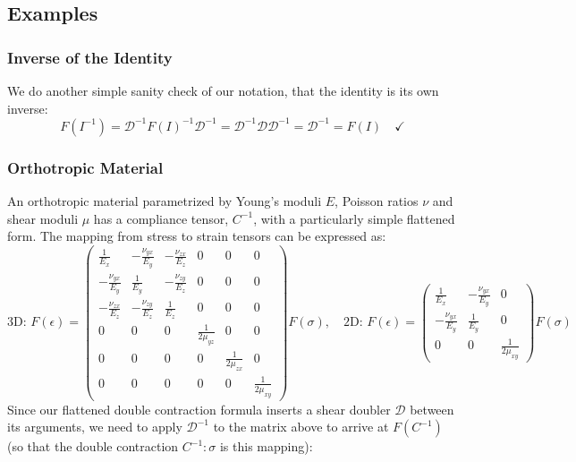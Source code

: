 \documentclass[10pt]{article}
\begin{document}
\subsection{Examples}
\subsubsection{Inverse of the Identity}
We do another simple sanity check of our notation, that the identity is its own
inverse:
$$
F(I^{-1}) = \mathscr{D}^{-1} F(I)^{-1} \mathscr{D}^{-1} = \mathscr{D}^{-1} \mathscr{D} \mathscr{D}^{-1} = \mathscr{D}^{-1} = F(I) \quad \checkmark
$$

\subsubsection{Orthotropic Material}
An orthotropic material parametrized by Young's moduli $E$, Poisson ratios $\nu$
and shear moduli $\mu$ has a compliance tensor, $C^{-1}$, with a particularly simple
flattened form. The mapping from stress to strain tensors can be expressed as:
$$
\text{3D: } F(\epsilon) =
\begin{pmatrix}
    \frac{1}{E_x} & -\frac{\nu_{yx}}{E_y} & -\frac{\nu_{zx}}{E_z} & 0 & 0 & 0 \\
    -\frac{\nu_{yx}}{E_y} & \frac{1}{E_y} & -\frac{\nu_{zy}}{E_z} & 0 & 0 & 0 \\
    -\frac{\nu_{zx}}{E_z} & -\frac{\nu_{zy}}{E_z} & \frac{1}{E_z} & 0 & 0 & 0 \\
    0 & 0 & 0 & \frac{1}{2 \mu_{yz}} & 0 & 0 \\
    0 & 0 & 0 & 0 & \frac{1}{2 \mu_{zx}} & 0 \\
    0 & 0 & 0 & 0 & 0 & \frac{1}{2 \mu_{xy}}
\end{pmatrix} F(\sigma), \quad
\text{2D: } F(\epsilon) = 
\begin{pmatrix}
    \frac{1}{E_x} & -\frac{\nu_{yx}}{E_y} & 0 \\
    -\frac{\nu_{yx}}{E_y} & \frac{1}{E_y}  & 0 \\
    0 & 0 & \frac{1}{2 \mu_{xy}}
\end{pmatrix} F(\sigma)
$$
Since our flattened double contraction formula inserts a shear doubler $\mathscr{D}$ between its
arguments, we need to apply $\mathscr{D}^{-1}$ to the matrix above to arrive at $F(C^{-1})$
(so that the double contraction $C^{-1} : \sigma$ is this mapping):
\end{document}
